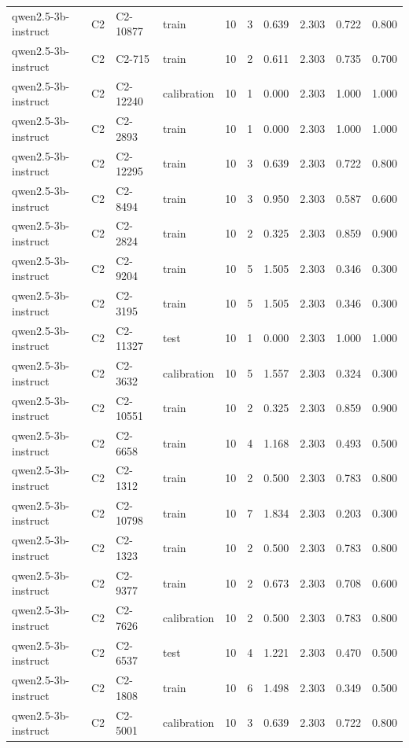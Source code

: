 \begin{table}
\begin{tabular}{llllrrrrrr}
qwen2.5-3b-instruct & C2 & C2-10877 & train & 10 & 3 & 0.639 & 2.303 & 0.722 & 0.800 \\
qwen2.5-3b-instruct & C2 & C2-715 & train & 10 & 2 & 0.611 & 2.303 & 0.735 & 0.700 \\
qwen2.5-3b-instruct & C2 & C2-12240 & calibration & 10 & 1 & 0.000 & 2.303 & 1.000 & 1.000 \\
qwen2.5-3b-instruct & C2 & C2-2893 & train & 10 & 1 & 0.000 & 2.303 & 1.000 & 1.000 \\
qwen2.5-3b-instruct & C2 & C2-12295 & train & 10 & 3 & 0.639 & 2.303 & 0.722 & 0.800 \\
qwen2.5-3b-instruct & C2 & C2-8494 & train & 10 & 3 & 0.950 & 2.303 & 0.587 & 0.600 \\
qwen2.5-3b-instruct & C2 & C2-2824 & train & 10 & 2 & 0.325 & 2.303 & 0.859 & 0.900 \\
qwen2.5-3b-instruct & C2 & C2-9204 & train & 10 & 5 & 1.505 & 2.303 & 0.346 & 0.300 \\
qwen2.5-3b-instruct & C2 & C2-3195 & train & 10 & 5 & 1.505 & 2.303 & 0.346 & 0.300 \\
qwen2.5-3b-instruct & C2 & C2-11327 & test & 10 & 1 & 0.000 & 2.303 & 1.000 & 1.000 \\
qwen2.5-3b-instruct & C2 & C2-3632 & calibration & 10 & 5 & 1.557 & 2.303 & 0.324 & 0.300 \\
qwen2.5-3b-instruct & C2 & C2-10551 & train & 10 & 2 & 0.325 & 2.303 & 0.859 & 0.900 \\
qwen2.5-3b-instruct & C2 & C2-6658 & train & 10 & 4 & 1.168 & 2.303 & 0.493 & 0.500 \\
qwen2.5-3b-instruct & C2 & C2-1312 & train & 10 & 2 & 0.500 & 2.303 & 0.783 & 0.800 \\
qwen2.5-3b-instruct & C2 & C2-10798 & train & 10 & 7 & 1.834 & 2.303 & 0.203 & 0.300 \\
qwen2.5-3b-instruct & C2 & C2-1323 & train & 10 & 2 & 0.500 & 2.303 & 0.783 & 0.800 \\
qwen2.5-3b-instruct & C2 & C2-9377 & train & 10 & 2 & 0.673 & 2.303 & 0.708 & 0.600 \\
qwen2.5-3b-instruct & C2 & C2-7626 & calibration & 10 & 2 & 0.500 & 2.303 & 0.783 & 0.800 \\
qwen2.5-3b-instruct & C2 & C2-6537 & test & 10 & 4 & 1.221 & 2.303 & 0.470 & 0.500 \\
qwen2.5-3b-instruct & C2 & C2-1808 & train & 10 & 6 & 1.498 & 2.303 & 0.349 & 0.500 \\
qwen2.5-3b-instruct & C2 & C2-5001 & calibration & 10 & 3 & 0.639 & 2.303 & 0.722 & 0.800 \\

\end{tabular}
\end{table}
